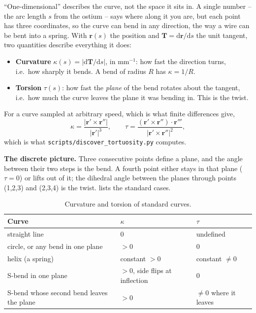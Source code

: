 ``One-dimensional'' describes the curve, not the space it sits in. A single number -- the arc
length $s$ from the ostium -- says where along it you are, but each point has three coordinates,
so the curve can bend in any direction, the way a wire can be bent into a spring. With $\mathbf r(s)$
the position and $\mathbf T = \mathrm d\mathbf r/\mathrm ds$ the unit tangent, two quantities
describe everything it does:
\begin{itemize}
  \item \textbf{Curvature} $\kappa(s) = \lvert \mathrm d\mathbf T/\mathrm ds \rvert$, in
    mm$^{-1}$: how fast the direction turns, i.e.\ how sharply it bends. A bend of radius $R$ has
    $\kappa = 1/R$.
  \item \textbf{Torsion} $\tau(s)$: how fast the \emph{plane} of the bend rotates about the
    tangent, i.e.\ how much the curve leaves the plane it was bending in. This is the twist.
\end{itemize}
For a curve sampled at arbitrary speed, which is what finite differences give,
\begin{equation}
  \kappa = \frac{\lvert \mathbf r' \times \mathbf r'' \rvert}{\lvert \mathbf r' \rvert^{3}},
  \qquad
  \tau = \frac{(\mathbf r' \times \mathbf r'') \cdot \mathbf r'''}{\lvert \mathbf r' \times
  \mathbf r'' \rvert^{2}},
  \label{eq:week3-frenet}
\end{equation}
which is what \texttt{scripts/discover\_tortuosity.py} computes.

\textbf{The discrete picture.} Three consecutive points define a plane, and the angle between
their two steps is the bend. A fourth point either stays in that plane ($\tau = 0$) or lifts out of
it; the dihedral angle between the planes through points (1,2,3) and (2,3,4) is the twist.
 lists the standard cases.

\begin{table}[htbp]
  \centering
  \small
  \begin{tabular}{@{}lll@{}}
    \toprule
    Curve & $\kappa$ & $\tau$ \\
    \midrule
    straight line & 0 & undefined \\
    circle, or any bend in one plane & $> 0$ & 0 \\
    helix (a spring) & constant $> 0$ & constant $\neq 0$ \\
    S-bend in one plane & $> 0$, side flips at inflection & 0 \\
    S-bend whose second bend leaves the plane & $> 0$ & $\neq 0$ where it leaves \\
    \bottomrule
  \end{tabular}
  \caption{Curvature and torsion of standard curves.}
  \label{tab:week3-curves}
\end{table}


